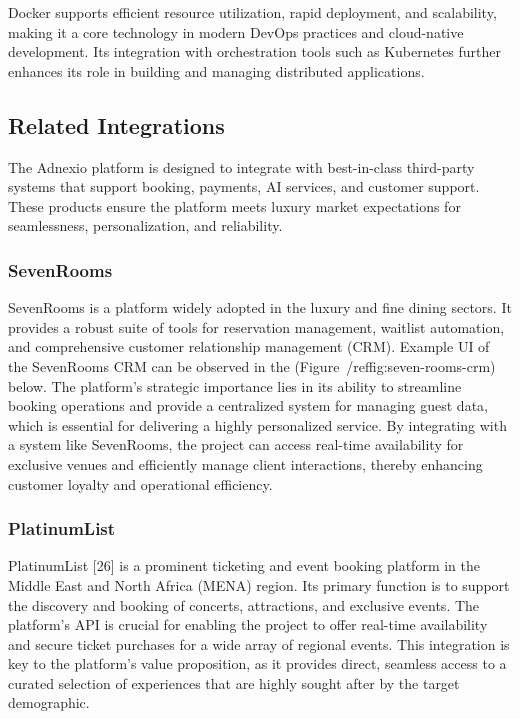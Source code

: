 Docker supports efficient resource utilization, rapid deployment, and scalability, making it a core technology in modern DevOps practices and cloud-native development. Its integration with orchestration tools such as Kubernetes further enhances its role in building and managing distributed applications.

\subsection{Related Integrations}
The Adnexio platform is designed to integrate with best-in-class third-party systems that support booking, payments, AI services, and customer support. These products ensure the platform meets luxury market expectations for seamlessness, personalization, and reliability.

\subsubsection{SevenRooms}
SevenRooms \cite{sevenrooms2025ourstory} is a platform widely adopted in the luxury and fine dining sectors. It provides a robust suite of tools for reservation management, waitlist automation, and comprehensive customer relationship management (CRM). Example UI of the SevenRooms CRM can be observed in the (Figure~/ref{fig:seven-rooms-crm}) below. The platform's strategic importance lies in its ability to streamline booking operations and provide a centralized system for managing guest data, which is essential for delivering a highly personalized service. By integrating with a system like SevenRooms, the project can access real-time availability for exclusive venues and efficiently manage client interactions, thereby enhancing customer loyalty and operational efficiency.

\subsubsection{PlatinumList}
PlatinumList [26] is a prominent ticketing and event booking platform in the Middle East and North Africa (MENA) region. Its primary function is to support the discovery and booking of concerts, attractions, and exclusive events. The platform's API is crucial for enabling the project to offer real-time availability and secure ticket purchases for a wide array of regional events. This integration is key to the platform's value proposition, as it provides direct, seamless access to a curated selection of experiences that are highly sought after by the target demographic.

